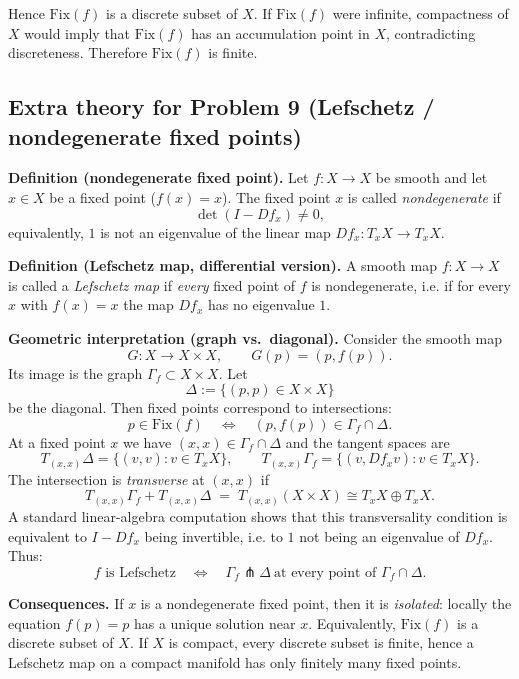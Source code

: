\documentclass[12pt,a4paper]{article}
\theoremstyle{plain}
\theoremstyle{definition}      %
\begin{document}
Hence $\mathrm{Fix}(f)$ is a discrete subset of $X$. If $\mathrm{Fix}(f)$ were infinite,
compactness of $X$ would imply that $\mathrm{Fix}(f)$ has an accumulation point in $X$,
contradicting discreteness. Therefore $\mathrm{Fix}(f)$ is finite.

\subsection*{Extra theory for Problem 9 (Lefschetz / nondegenerate fixed points)}

\noindent\textbf{Definition (nondegenerate fixed point).}
Let $f:X\to X$ be smooth and let $x\in X$ be a fixed point ($f(x)=x$).
The fixed point $x$ is called \emph{nondegenerate} if
\[
\det(I - Df_x)\neq 0,
\]
equivalently, $1$ is not an eigenvalue of the linear map $Df_x:T_xX\to T_xX$.

\medskip
\noindent\textbf{Definition (Lefschetz map, differential version).}
A smooth map $f:X\to X$ is called a \emph{Lefschetz map} if \emph{every} fixed point of $f$ is nondegenerate,
i.e. if for every $x$ with $f(x)=x$ the map $Df_x$ has no eigenvalue $1$.

\medskip
\noindent\textbf{Geometric interpretation (graph vs.\ diagonal).}
Consider the smooth map
\[
G:X\longrightarrow X\times X,\qquad G(p)=(p,f(p)).
\]
Its image is the graph $\Gamma_f\subset X\times X$. Let
\[
\Delta:=\{(p,p)\in X\times X\}
\]
be the diagonal. Then fixed points correspond to intersections:
\[
p\in \mathrm{Fix}(f)\quad \Longleftrightarrow\quad (p,f(p))\in \Gamma_f\cap \Delta.
\]
At a fixed point $x$ we have $(x,x)\in \Gamma_f\cap \Delta$ and the tangent spaces are
\[
T_{(x,x)}\Delta=\{(v,v): v\in T_xX\},
\qquad
T_{(x,x)}\Gamma_f=\{(v, Df_x v): v\in T_xX\}.
\]
The intersection is \emph{transverse} at $(x,x)$ if
\[
T_{(x,x)}\Gamma_f + T_{(x,x)}\Delta \;=\; T_{(x,x)}(X\times X)\cong T_xX\oplus T_xX.
\]
A standard linear-algebra computation shows that this transversality condition is equivalent to
$I-Df_x$ being invertible, i.e. to $1$ not being an eigenvalue of $Df_x$.
Thus:
\[
\text{$f$ is Lefschetz}
\quad \Longleftrightarrow\quad
\Gamma_f \pitchfork \Delta \ \text{at every point of } \Gamma_f\cap\Delta.
\]

\medskip
\noindent\textbf{Consequences.}
If $x$ is a nondegenerate fixed point, then it is \emph{isolated}:
locally the equation $f(p)=p$ has a unique solution near $x$.
Equivalently, $\mathrm{Fix}(f)$ is a discrete subset of $X$.
If $X$ is compact, every discrete subset is finite, hence a Lefschetz map on a compact manifold has only finitely many fixed points.
\end{document}

